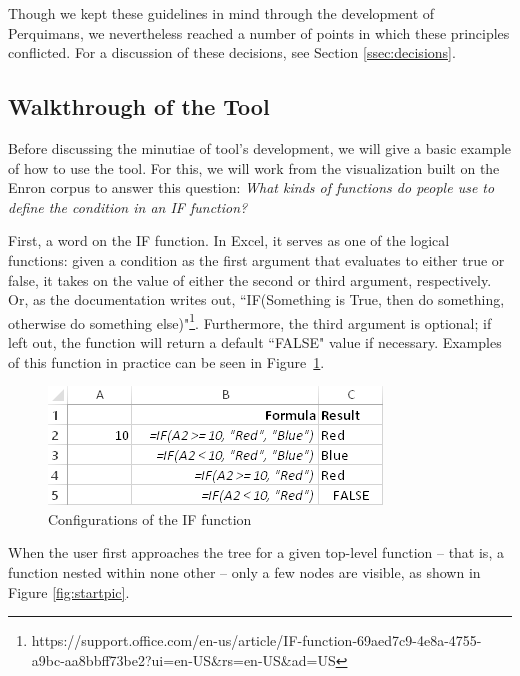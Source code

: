 \documentclass[conference]{IEEEtran}
\newcommand{\toolname}{Perquimans\xspace} \newcommand{\toolnameend}{Perquimans}
\begin{document}
	Though we kept these guidelines in mind through the development of \toolname,
	we nevertheless reached a number of points in which these principles
	conflicted. For a discussion of these decisions, see Section
	\ref{ssec:decisions}.
	
	\subsection{Walkthrough of the Tool} \label{sec:walkthrough}Before discussing
	the minutiae of tool's development, we will give a basic example of how to use
	the tool. For this, we will work from the visualization built on the Enron
	corpus to answer this question: \textit{ What kinds of functions do people use
		to define the condition in an IF function?} \par
	
	First, a word on the IF function. In Excel, it serves as one of the logical
	functions: given a condition as the first argument that evaluates to either
	true or false, it takes on the value of either the second or third argument,
	respectively. Or, as the documentation writes out, ``IF(Something is True, then
	do something, otherwise do something
	else)"\footnote{https://support.office.com/en-us/article/IF-function-69aed7c9-4e8a-4755-a9bc-aa8bbff73be2?ui=en-US\&rs=en-US\&ad=US}. Furthermore, the third argument is optional; if left out, the function will return a default ``FALSE" value if necessary. Examples of this function in practice can be seen in Figure~\ref{fig:ifexample}.
	
	\begin{figure}[h] \centering \includegraphics[scale=.9]{ifExample}
		\caption{Configurations of the IF function} \label{fig:ifexample} \end{figure}
	
	When the user first approaches the tree for a given top-level function -- that
	is, a function nested within none other -- only a few nodes are visible, as
	shown in Figure \ref{fig:startpic}. \par
	
\end{document}
